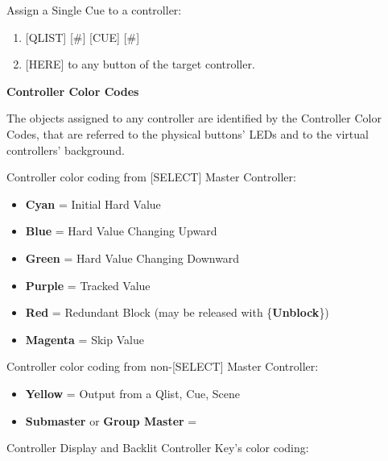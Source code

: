 \documentclass[
]{article}
\providecommand{\tightlist}{%
  \setlength{\itemsep}{0pt}\setlength{\parskip}{0pt}}
\begin{document}
Assign a Single Cue to a controller:

\begin{enumerate}
\def\labelenumi{\arabic{enumi}.}
\item
  {[}QLIST{]} {[}\#{]} {[}CUE{]} {[}\#{]}
\item
  {[}HERE{]} to any button of the target controller.
\end{enumerate}

\textbf{Controller Color Codes}

The objects assigned to any controller are identified by the Controller Color Codes, that are referred to the physical buttons' LEDs and to the virtual controllers' background.

Controller color coding from {[}SELECT{]} Master Controller:

\begin{itemize}
\tightlist
\item
  \textbf{Cyan} = Initial Hard Value
\item
  \textbf{Blue} = Hard Value Changing Upward
\item
  \textbf{Green} = Hard Value Changing Downward
\item
  \textbf{Purple} = Tracked Value
\item
  \textbf{Red} = Redundant Block (may be released with \{\textbf{Unblock}\})
\item
  \textbf{Magenta} = Skip Value
\end{itemize}

Controller color coding from non-{[}SELECT{]} Master Controller:

\begin{itemize}
\tightlist
\item
  \textbf{Yellow} = Output from a Qlist, Cue, Scene
\item
  \textbf{Submaster} or \textbf{Group Master} =
\end{itemize}

Controller Display and Backlit Controller Key's color coding:
\end{document}
